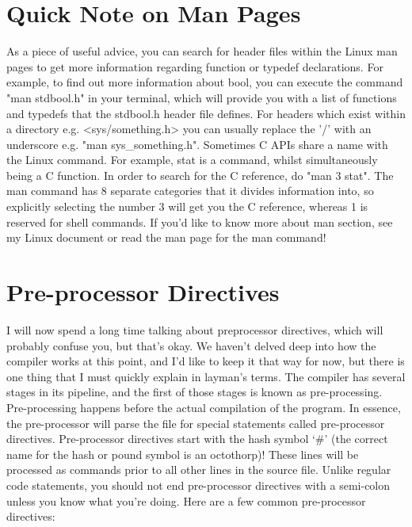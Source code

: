 \documentclass{article}
\begin{document}
\section{Quick Note on Man Pages}

As a piece of useful advice, you can search for header files within the Linux man pages to get more information
regarding function or typedef declarations. For example, to find out more information about bool, you can
execute the command "man stdbool.h" in your terminal, which will provide you with a list of functions and
typedefs that the stdbool.h header file defines. For headers which exist within a directory e.g.
<sys/something.h> you can usually replace the '/' with an underscore e.g. "man sys\_something.h". Sometimes C
APIs share a name with the Linux command. For example, stat is a command, whilst simultaneously being a C
function. In order to search for the C reference, do "man 3 stat". The man command has 8 separate categories
that it divides information into, so explicitly selecting the number 3 will get you the C reference, whereas 1
is reserved for shell commands. If you’d like to know more about man section, see my Linux document or read
the man page for the man command!

\section{Pre-processor Directives}

I will now spend a long time talking about preprocessor directives, which will probably confuse you,
but that’s okay. We haven’t delved deep into how the compiler works at this point, and I’d like to keep it
that way for now, but there is one thing that I must quickly explain in layman’s terms. The compiler has
several  stages in its pipeline, and the first of those stages is known as pre-processing. Pre-processing
happens before the actual compilation of the program. In essence, the pre-processor will parse the file for
special statements called pre-processor directives. Pre-processor directives start with the hash symbol ‘\#’
(the correct name for the hash or pound symbol is an octothorp)! These lines will be processed as commands
prior to all other lines in the source file. Unlike regular code statements, you should not end pre-processor
directives with a semi-colon unless you know what you’re doing. Here are a few common pre-processor directives:
\end{document}
